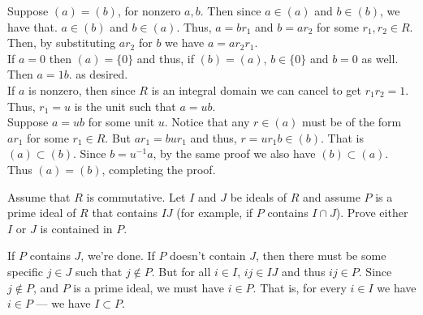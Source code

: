 \documentclass[12 pt, letterpaper]{hmcpset}
\begin{document}
\begin{solution}	
	Suppose $(a) = (b)$, for nonzero $a, b$. Then since $a \in (a)$ and $b \in (b)$, we have that. $a \in (b)$ and $b \in (a)$. Thus, $a = br_{1}$ and $b = a r_{2}$ for some $r_{1}, r_{2} \in R$. Then, by substituting $ar_{2}$ for $b$ we have $a = a r_{2} r_{1}$. \\

	If $a = 0$ then $(a) = \{ 0 \}$ and thus, if $(b) = (a)$, $b \in \{ 0 \}$ and $b = 0$ as well. Then $a = 1 b$. as desired. \\
	
	If $a$ is nonzero, then since $R$ is an integral domain we can cancel to get $r_{1} r_{2} = 1$. Thus, $r_{1} = u$ is the unit such that $a = ub$. \\

	Suppose $a = ub$ for some unit $u$. Notice that any $r \in (a)$ must be of the form $ar_{1}$ for some $r_{1} \in R$. But $ar_{1} = b u r_{1}$ and thus, $r = u r_{1} b \in (b)$. That is $(a) \subset (b)$. Since $b = u^{-1} a$, by the same proof we also have $(b) \subset (a)$. Thus $(a) = (b)$, completing the proof.
\end{solution}

\pagebreak

\begin{problem}
	Assume that $R$ is commutative. Let $I$ and $J$ be ideals of $R$ and assume $P$ is a prime ideal of $R$ that contains $IJ$ (for example, if $P$ contains $I \cap J$). Prove either $I$ or $J$ is contained in $P$.
\end{problem}

\begin{solution}
	If $P$ contains $J$, we're done. If $P$ doesn't contain $J$, then there must be some specific $j \in J$ such that $j \notin P$. But for all $i \in I$, $ij \in IJ$ and thus $ij \in P$. Since $j \notin P$, and $P$ is a prime ideal, we must have $i \in P$. That is, for every $i \in I$ we have $i \in P$ --- we have $I \subset P$.
\end{solution}
\end{document}
